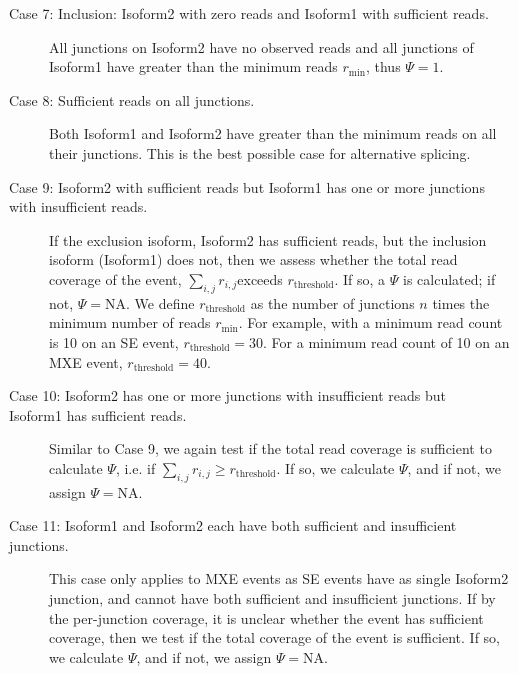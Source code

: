 \begin{description}
	\item[Case 7: Inclusion: Isoform2 with zero reads and Isoform1 with sufficient reads.] All junctions on Isoform2 have no observed reads and all junctions of Isoform1 have greater than the minimum reads $r_{\min}$, thus $\Psi = 1$.
	\item[Case 8: Sufficient reads on all junctions.] Both Isoform1 and Isoform2 have greater than the minimum reads on all their junctions. This is the best possible case for alternative splicing.
	\item[Case 9: Isoform2 with sufficient reads but Isoform1 has one or more junctions\\with insufficient reads.] If the exclusion isoform, Isoform2 has sufficient reads, but the inclusion isoform (Isoform1) does not, then we assess whether the total read coverage of the event, $\sum_{i,j} r_{i,j}$exceeds $r_{\text{threshold}}$. If so, a $\Psi$ is calculated; if not, $\Psi = \text{NA}$. We define $r_{\text{threshold}}$ as the number of junctions $n$ times the minimum number of reads $r_{\min}$. For example, with a minimum read count is 10 on an SE event, $r_{\text{threshold}} = 30$. For a minimum read count of 10 on an MXE event, $r_{\text{threshold}} = 40$.
	\item[Case 10: Isoform2 has one or more junctions with insufficient reads but\\Isoform1 has sufficient reads.] Similar to Case 9, we again test if the total read coverage is sufficient to calculate $\Psi$, i.e. if $\sum_{i,j} r_{i,j} \geq r_{\text{threshold}}$. If so, we calculate $\Psi$, and if not, we assign $\Psi = \text{NA}$.
	\item[Case 11: Isoform1 and Isoform2 each have both sufficient and insufficient\\junctions.] This case only applies to MXE events as SE events have as single Isoform2 junction, and cannot have both sufficient and insufficient junctions. If by the per-junction coverage, it is unclear whether the event has sufficient coverage, then we test if the total coverage of the event is sufficient. If so, we calculate $\Psi$, and if not, we assign $\Psi = \text{NA}$.
\end{description}


